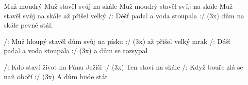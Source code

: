 \begin{TEXT}{Muž moudrý}
\SLOKA Muž  stavěl  svůj na skále 
Muž moudrý stavěl  svůj na skále 
Muž  stavěl  svůj na skále 
až přišel velký 
/: Déšť padal a voda stoupala :/ (3x) 
dům na skále pevně stál.

\SLOKA /: Muž hloupý stavěl dům svůj na písku :/ (3x) 
až přišel velký mrak
/: Déšť padal a voda stoupala :/ (3x) 
a dům se rozsypal
 
\SLOKA /: Kdo staví život na Pánu Ježíši :/ (3x)
Ten staví na skále
/: Když bouře zlá se naň oboří :/ (3x)
A dům bude stát

\end{TEXT}